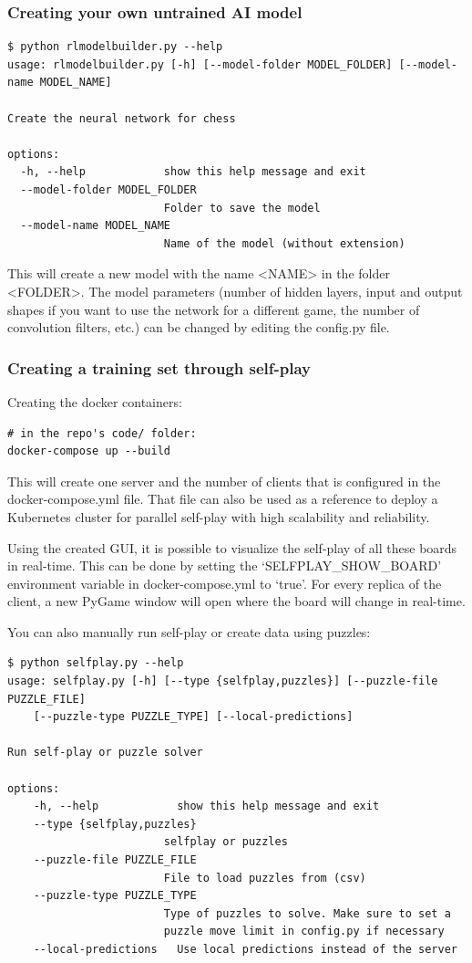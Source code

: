 \documentclass{article}
\begin{document}
\subsubsection{Creating your own untrained AI model}

\begin{verbatim}
$ python rlmodelbuilder.py --help
usage: rlmodelbuilder.py [-h] [--model-folder MODEL_FOLDER] [--model-name MODEL_NAME]

Create the neural network for chess

options:
  -h, --help            show this help message and exit
  --model-folder MODEL_FOLDER
                        Folder to save the model
  --model-name MODEL_NAME
                        Name of the model (without extension)
\end{verbatim}

This will create a new model with the name <NAME> in the folder <FOLDER>.
The model parameters (number of hidden layers, input and output shapes if you want to use the network for a different game, the number of convolution filters, etc.)
can be changed by editing the config.py file.

\subsubsection{Creating a training set through self-play}

Creating the docker containers:

\begin{verbatim}
# in the repo's code/ folder:
docker-compose up --build
\end{verbatim}

This will create one server and the number of clients that is configured in the docker-compose.yml file.
That file can also be used as a reference to deploy a Kubernetes cluster for parallel self-play with 
high scalability and reliability. 

Using the created GUI, it is possible to visualize the self-play of all these boards in real-time.
This can be done by setting the `SELFPLAY\_SHOW\_BOARD' environment variable in docker-compose.yml to `true'.
For every replica of the client, a new PyGame window will open where the board will change in real-time. 

You can also manually run self-play or create data using puzzles:

\begin{verbatim}
$ python selfplay.py --help
usage: selfplay.py [-h] [--type {selfplay,puzzles}] [--puzzle-file PUZZLE_FILE] 
    [--puzzle-type PUZZLE_TYPE] [--local-predictions]

Run self-play or puzzle solver

options:
    -h, --help            show this help message and exit
    --type {selfplay,puzzles}
                        selfplay or puzzles
    --puzzle-file PUZZLE_FILE
                        File to load puzzles from (csv)
    --puzzle-type PUZZLE_TYPE
                        Type of puzzles to solve. Make sure to set a 
                        puzzle move limit in config.py if necessary
    --local-predictions   Use local predictions instead of the server
\end{verbatim}
\end{document}
